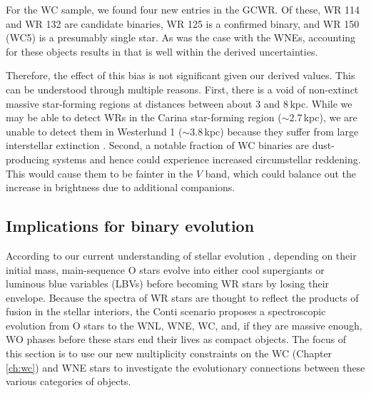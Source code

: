For the WC sample, we found four new entries in the GCWR. Of these, WR 114 \citep[WC5\,+\,OB?:][]{2001vanderHucht} and WR 132 \citep[WC6\,+\,?:][]{1983BisiacchiWR132} are candidate binaries, WR 125 \citep[WC7ed\,+\,O9III:][]{2019WilliamsNEOWISE,2021AroraWR125} is a confirmed binary, and WR 150 (WC5) is a presumably single star. As was the case with the WNEs, accounting for these objects results in \fintWC{} that is well within the derived uncertainties. 

Therefore, the effect of this bias is not significant given our derived values. This can be understood through multiple reasons. First, there is a void of non-extinct massive star-forming regions at distances between about 3 and 8\,kpc. While we may be able to detect WRs in the Carina star-forming region (${\sim}$2.7\,kpc), we are unable to detect them in Westerlund 1 (${\sim}$3.8\,kpc) because they suffer from large interstellar extinction \citep{2005Clark}. Second, a notable fraction of WC binaries are dust-producing systems \citep{1995Williamsdust} and hence could experience increased circumstellar reddening. This would cause them to be fainter in the $V$ band, which could balance out the increase in brightness due to additional companions.

\subsection{Implications for binary evolution}

According to our current understanding of stellar evolution \citep{1976Conti,2003MeynetMaeder,2007Crowther}, depending on their initial mass, main-sequence O stars evolve into either cool supergiants or luminous blue variables (LBVs) before becoming WR stars by losing their envelope. Because the spectra of WR stars are thought to reflect the products of fusion in the stellar interiors, the Conti scenario \citep{1976Conti,2007Crowther} proposes a spectroscopic evolution from O stars to the WNL, WNE, WC, and, if they are massive enough, WO phases before these stars end their lives as compact objects. The focus of this section is to use our new multiplicity constraints on the WC (Chapter \ref{ch:wc}) and WNE stars to investigate the evolutionary connections between these various categories of objects.

